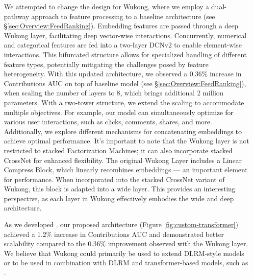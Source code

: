 We attempted to change the design for Wukong, where we employ a dual-pathway approach to feature processing to a baseline architecture (see \S\ref{sec:Overview:FeedRanking}). Embedding features are passed through a deep Wukong layer, facilitating deep vector-wise interactions. Concurrently, numerical and categorical features are fed into a two-layer DCNv2 to enable element-wise interactions. This bifurcated structure allows for specialized handling of different feature types, potentially mitigating the challenges posed by feature heterogeneity. With this updated architecture, we observed a 0.36\% increase in Contributions AUC on top of baseline model (see \S\ref{sec:Overview:FeedRanking}), when scaling the number of layers to 8, which brings additional 2 million parameters.  With a two-tower structure, we extend the scaling to accommodate multiple objectives. For example, our model can simultaneously optimize for various user interactions, such as clicks, comments, shares, and more. Additionally, we explore different mechanisms for concatenating embeddings to achieve optimal performance. It's important to note that the Wukong layer is not restricted to stacked Factorization Machines; it can also incorporate stacked CrossNet for enhanced flexibility. The original Wukong Layer includes a Linear Compress Block, which linearly recombines embeddings — an important element for performance. When incorporated into the stacked CrossNet variant of Wukong, this block is adapted into a wide layer. This provides an interesting perspective, as each layer in Wukong effectively embodies the wide and deep architecture. 

As we developed {\systemname}, our proposed architecture (Figure \ref{fig:custom-transformer}) achieved a 1.2\% increase in Contributions AUC and demonstrated better scalability compared to the 0.36\% improvement observed with the Wukong layer. We believe that Wukong could primarily be used to extend DLRM-style models \cite{DLRM19} or to be used in combination with DLRM and transformer-based models, such as \cite{zeng2024interformer}.